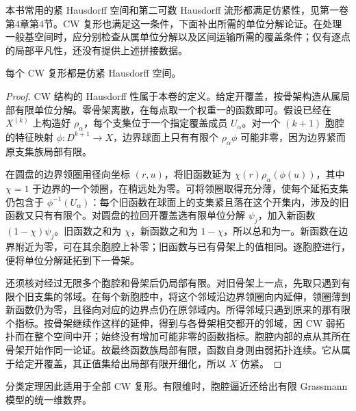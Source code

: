 \ProseParagraphBreak

本书常用的紧 Hausdorff 空间和第二可数 Hausdorff 流形都满足仿紧性，见第一卷第4章第4节。CW 复形也满足这一条件，下面补出所需的单位分解论证。在处理一般基空间时，应分别检查从属单位分解以及区间运输所需的覆盖条件；仅有逐点的局部平凡性，还没有提供上述拼接数据。

\begin{lemma}\label{g2:lem:cw-paracompact-partitions}
	每个 CW 复形都是仿紧 Hausdorff 空间。
\end{lemma}
\begin{proof}
	CW 结构的 Hausdorff 性属于本卷的定义。给定开覆盖，按骨架构造从属局部有限单位分解。零骨架离散，在每点取一个权重一的函数即可。假设已经在 \(X^{(k)}\) 上构造好 \(\rho_\alpha\)，每个支集位于一个指定覆盖成员 \(U_\alpha\)。对一个 \((k+1)\) 胞腔的特征映射 \(\phi:D^{k+1}\to X\)，边界球面上只有有限个 \(\rho_\alpha\phi\) 可能非零，因为边界紧而原支集族局部有限。

	在圆盘的边界领圈用径向坐标 \((r,u)\)，将旧函数延为 \(\chi(r)\rho_\alpha(\phi(u))\)，其中 \(\chi=1\) 于边界的一个领圈，在稍远处为零。可将领圈取得充分薄，使每个延拓支集仍包含于 \(\phi^{-1}(U_\alpha)\)：每个旧函数在球面上的支集紧且落在这个开集内，涉及的旧函数又只有有限个。对圆盘的拉回开覆盖选有限单位分解 \(\psi_j\)，加入新函数 \((1-\chi)\psi_j\)。旧函数之和为 \(\chi\)，新函数之和为 \(1-\chi\)，所以总和为一。新函数在边界附近为零，可在其余胞腔上补零；旧函数与已有骨架上的值相同。逐胞腔进行，便将单位分解延拓到下一骨架。

	还须核对经过无限多个胞腔和骨架后仍局部有限。对旧骨架上一点，先取只遇到有限个旧支集的邻域。在每个新胞腔中，将这个邻域沿边界领圈向内延伸，领圈薄到新函数仍为零，且径向对应的边界点仍在原邻域内。所得邻域只遇到原来的那有限个指标。按骨架继续作这样的延伸，得到与各骨架相交都开的邻域，因 CW 弱拓扑而在整个空间中开；始终没有增加可能非零的函数指标。胞腔内部的点从其所在骨架开始作同一论证。故最终函数族局部有限，函数自身则由弱拓扑连续。它从属于给定开覆盖，其正值集给出局部有限开细化，所以 \(X\) 仿紧。
\end{proof}

分类定理因此适用于全部 CW 复形。有限维时，胞腔逼近还给出有限 Grassmann 模型的统一维数界。

